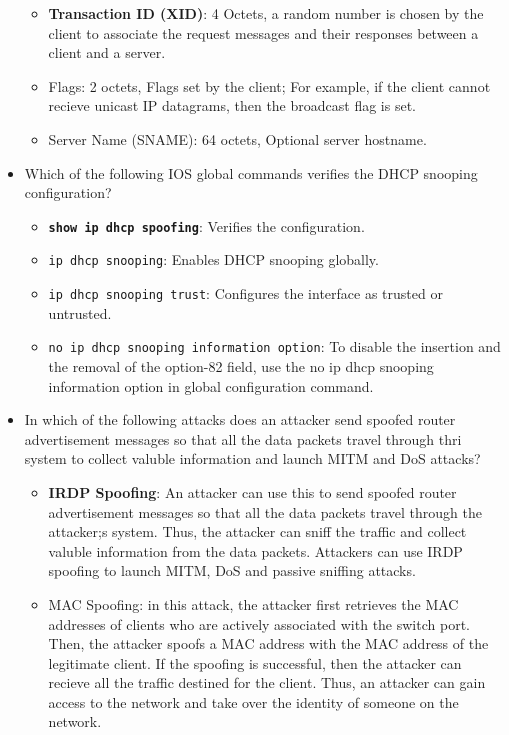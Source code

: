 \begin{itemize}
\begin{itemize}
        \item \textbf{Transaction ID (XID)}: 4 Octets, a random number is chosen by the client to associate the request messages and their responses between a client and a server.
        \item Flags: 2 octets, Flags set by the client; For example, if the client cannot recieve unicast IP datagrams, then the broadcast flag is set.
        \item Server Name (SNAME): 64 octets, Optional server hostname.
    \end{itemize}
    \item Which of the following IOS global commands verifies the DHCP snooping configuration?
    \begin{itemize}
        \item \textbf{\verb|show ip dhcp spoofing|}: Verifies the configuration.
        \item \verb|ip dhcp snooping|: Enables DHCP snooping globally.
        \item \verb|ip dhcp snooping trust|: Configures the interface as trusted or untrusted.
        \item \verb|no ip dhcp snooping information option|: To disable the insertion and the removal of the option-82 field, use the no ip dhcp snooping information option in global configuration command.
    \end{itemize}
    \item In which of the following attacks does an attacker send spoofed router advertisement messages so that all the data packets travel through thri system to collect valuble information and launch MITM and DoS attacks?
    \begin{itemize}
        \item \textbf{IRDP Spoofing}: An attacker can use this to send spoofed router advertisement messages so that all the data packets travel through the attacker;s system. Thus, the attacker can sniff the traffic and collect valuble information from the data packets. Attackers can use IRDP spoofing to launch MITM, DoS and passive sniffing attacks.
        \item MAC Spoofing: in this attack, the attacker first retrieves the MAC addresses of clients who are actively associated with the switch port. Then, the attacker spoofs a MAC address with the MAC address of the legitimate client. If the spoofing is successful, then the attacker can recieve all the traffic destined for the client. Thus, an attacker can gain access to the network and take over the identity of someone on the network.

\end{itemize}
\end{itemize}
